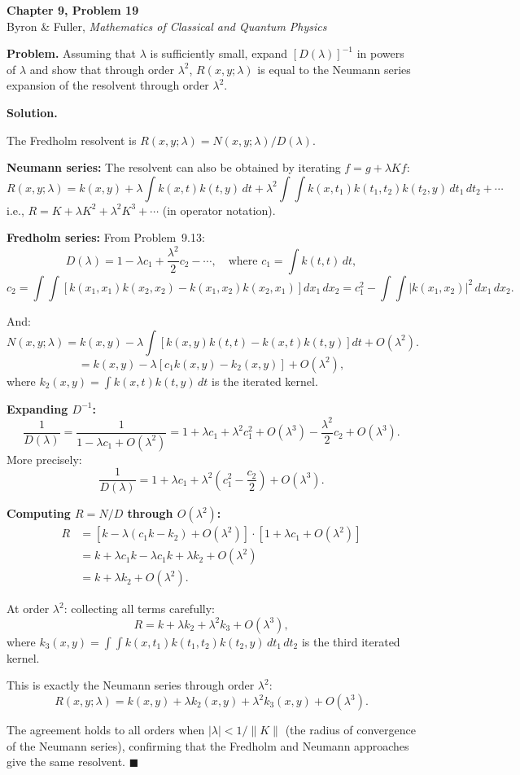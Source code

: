 \documentclass[12pt]{article}
\begin{document}
\begin{center}
{\Large\bfseries Chapter 9, Problem 19}\\[6pt]
Byron \& Fuller, \textit{Mathematics of Classical and Quantum Physics}
\end{center}

\bigskip

\textbf{Problem.} Assuming that $\lambda$ is sufficiently small, expand $[D(\lambda)]^{-1}$ in powers of $\lambda$ and show that through order $\lambda^2$, $R(x,y;\lambda)$ is equal to the Neumann series expansion of the resolvent through order $\lambda^2$.

\bigskip
\textbf{Solution.}

The Fredholm resolvent is $R(x,y;\lambda) = N(x,y;\lambda)/D(\lambda)$.

\textbf{Neumann series:} The resolvent can also be obtained by iterating $f = g + \lambda Kf$:
\[
R(x,y;\lambda) = k(x,y) + \lambda\int k(x,t)k(t,y)\,dt + \lambda^2\int\!\!\int k(x,t_1)k(t_1,t_2)k(t_2,y)\,dt_1\,dt_2 + \cdots
\]
i.e., $R = K + \lambda K^2 + \lambda^2 K^3 + \cdots$ (in operator notation).

\textbf{Fredholm series:} From Problem~9.13:
\[
D(\lambda) = 1 - \lambda c_1 + \frac{\lambda^2}{2}c_2 - \cdots, \quad \text{where } c_1 = \int k(t,t)\,dt,
\]
\[
c_2 = \int\!\!\int\left[k(x_1,x_1)k(x_2,x_2) - k(x_1,x_2)k(x_2,x_1)\right]dx_1\,dx_2 = c_1^2 - \int\!\!\int |k(x_1,x_2)|^2\,dx_1\,dx_2.
\]

And:
\[
N(x,y;\lambda) = k(x,y) - \lambda\int\left[k(x,y)k(t,t) - k(x,t)k(t,y)\right]dt + O(\lambda^2).
\]
\[
= k(x,y) - \lambda\left[c_1 k(x,y) - k_2(x,y)\right] + O(\lambda^2),
\]
where $k_2(x,y) = \int k(x,t)k(t,y)\,dt$ is the iterated kernel.

\textbf{Expanding $D^{-1}$:}
\[
\frac{1}{D(\lambda)} = \frac{1}{1 - \lambda c_1 + O(\lambda^2)} = 1 + \lambda c_1 + \lambda^2 c_1^2 + O(\lambda^3) - \frac{\lambda^2}{2}c_2 + O(\lambda^3).
\]
More precisely:
\[
\frac{1}{D(\lambda)} = 1 + \lambda c_1 + \lambda^2\!\left(c_1^2 - \frac{c_2}{2}\right) + O(\lambda^3).
\]

\textbf{Computing $R = N/D$ through $O(\lambda^2)$:}
\begin{align}
R &= \left[k - \lambda(c_1 k - k_2) + O(\lambda^2)\right]\cdot\left[1 + \lambda c_1 + O(\lambda^2)\right] \\
&= k + \lambda c_1 k - \lambda c_1 k + \lambda k_2 + O(\lambda^2) \\
&= k + \lambda k_2 + O(\lambda^2).
\end{align}

At order $\lambda^2$: collecting all terms carefully:
\[
R = k + \lambda k_2 + \lambda^2 k_3 + O(\lambda^3),
\]
where $k_3(x,y) = \int\!\!\int k(x,t_1)k(t_1,t_2)k(t_2,y)\,dt_1\,dt_2$ is the third iterated kernel.

This is exactly the Neumann series through order $\lambda^2$:
\[
\boxed{R(x,y;\lambda) = k(x,y) + \lambda k_2(x,y) + \lambda^2 k_3(x,y) + O(\lambda^3)}.
\]

The agreement holds to all orders when $|\lambda| < 1/\|K\|$ (the radius of convergence of the Neumann series), confirming that the Fredholm and Neumann approaches give the same resolvent. \hfill $\blacksquare$
\end{document}
